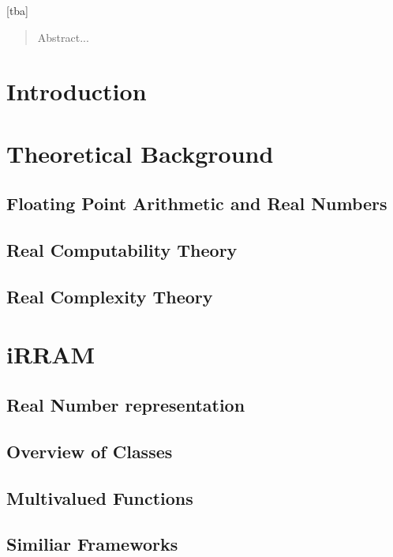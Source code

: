 \documentclass[tudarticle,type=msc,colorback,accentcolor=tud9c]{tudthesis}
\begin{document}
  \author{Holger Thies}
  [tba]
  \dateofexam{\today}{\today}
  \makethesistitle
\dedication{Danksagung...}
\begin{abstract}
    Abstract...
\end{abstract}  
\tableofcontents
  \chapter{Introduction}

  \chapter{Theoretical Background}
  \section{Floating Point Arithmetic and Real Numbers}
  \section{Real Computability Theory}
  \section{Real Complexity Theory}

  \chapter{iRRAM}
  \section{Real Number representation}
  \section{Overview of Classes}
  \section{Multivalued Functions}
  \section{Similiar Frameworks}
\end{document}
